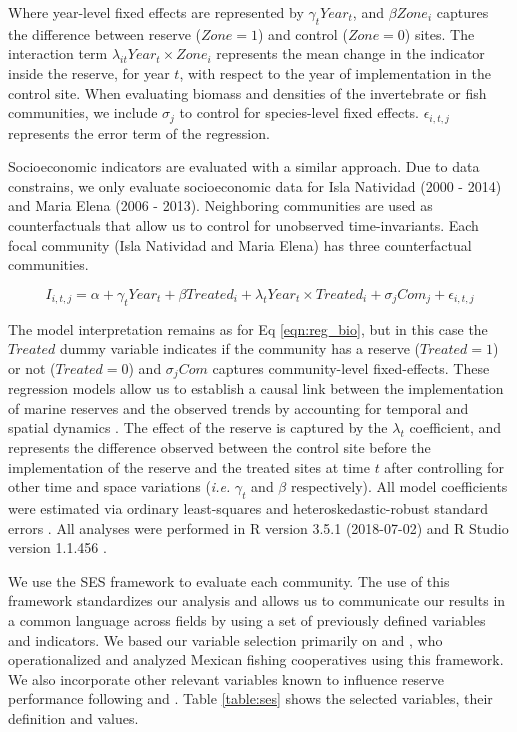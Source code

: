 \documentclass{frontiersSCNS}
\begin{document}
Where year-level fixed effects are represented by \(\gamma_t Year_t\),
and \(\beta Zone_i\) captures the difference between reserve
(\(Zone = 1\)) and control (\(Zone = 0\)) sites. The interaction term
\(\lambda_{it} Year_t\times Zone_i\) represents the mean change in the
indicator inside the reserve, for year \(t\), with respect to the year
of implementation in the control site. When evaluating biomass and
densities of the invertebrate or fish communities, we include
\(\sigma_j\) to control for species-level fixed effects.
\(\epsilon_{i,t,j}\) represents the error term of the regression.

Socioeconomic indicators are evaluated with a similar approach. Due to
data constrains, we only evaluate socioeconomic data for Isla Natividad
(2000 - 2014) and Maria Elena (2006 - 2013). Neighboring communities are
used as counterfactuals that allow us to control for unobserved
time-invariants. Each focal community (Isla Natividad and Maria Elena)
has three counterfactual communities.

\begin{equation}
I_{i,t,j} = \alpha + \gamma_{t} Year_t + \beta Treated_i + \lambda_{t} Year_t\times Treated_i + \sigma_jCom_j +\epsilon_{i,t,j}
\label{eqn:soc_reg}
\end{equation}

The model interpretation remains as for Eq \ref{eqn:reg_bio}, but in
this case the \(Treated\) dummy variable indicates if the community has
a reserve (\(Treated = 1\)) or not (\(Treated = 0\)) and \(\sigma_jCom\)
captures community-level fixed-effects. These regression models allow us
to establish a causal link between the implementation of marine reserves
and the observed trends by accounting for temporal and spatial dynamics
\citep{depalma_2018}. The effect of the reserve is captured by the
\(\lambda_t\) coefficient, and represents the difference observed
between the control site before the implementation of the reserve and
the treated sites at time \(t\) after controlling for other time and
space variations (\emph{i.e.} \(\gamma_t\) and \(\beta\) respectively).
All model coefficients were estimated via ordinary least-squares and
heteroskedastic-robust standard errors \citep{zeileis_2004-7n}. All
analyses were performed in R version 3.5.1 (2018-07-02) and R Studio
version 1.1.456 \citep{R_2018}.

We use the SES framework to evaluate each community. The use of this
framework standardizes our analysis and allows us to communicate our
results in a common language across fields by using a set of previously
defined variables and indicators. We based our variable selection
primarily on \citet{leslie_2015-na} and \citet{basurto_2013-oq}, who
operationalized and analyzed Mexican fishing cooperatives using this
framework. We also incorporate other relevant variables known to
influence reserve performance following \citet{difranco_2016-Xw} and
\citet{edgar_2014-UO}. Table \ref{table:ses} shows the selected
variables, their definition and values.
\end{document}

